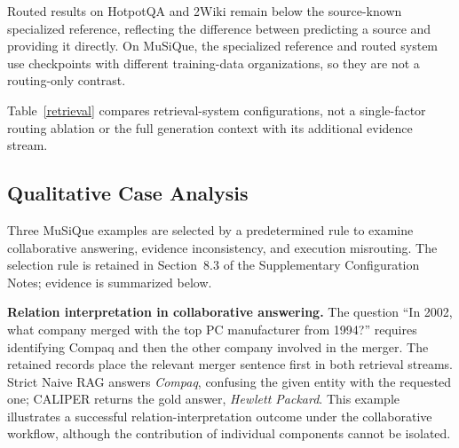 \documentclass[a4paper,fleqn]{cas-dc}
\begin{document}
\begin{table}[pos=!htb]
\caption{Retrieval-only comparison: mean evidence recall at the top 3/5/10 sentence-level units. MuSiQue maps these units to source paragraphs for recall scoring only; FT-SEP is the source-known reference.}
\label{retrieval}
\centering
\fontsize{8}{10}\selectfont
\setlength{\tabcolsep}{2.5pt}
\end{table}

Routed results on HotpotQA and 2Wiki remain below the source-known specialized reference, reflecting the difference between predicting a source and providing it directly. On MuSiQue, the specialized reference and routed system use checkpoints with different training-data organizations, so they are not a routing-only contrast.

Table~\ref{retrieval} compares retrieval-system configurations, not a single-factor routing ablation or the full generation context with its additional evidence stream.

\subsection{Qualitative Case Analysis}
Three MuSiQue examples are selected by a predetermined rule to examine collaborative answering, evidence inconsistency, and execution misrouting. The selection rule is retained in Section~8.3 of the Supplementary Configuration Notes; evidence is summarized below.

\textbf{Relation interpretation in collaborative answering.} The question ``In 2002, what company merged with the top PC manufacturer from 1994?'' requires identifying Compaq and then the other company involved in the merger. The retained records place the relevant merger sentence first in both retrieval streams. Strict Naive RAG answers \textit{Compaq}, confusing the given entity with the requested one; CALIPER returns the gold answer, \textit{Hewlett Packard}. This example illustrates a successful relation-interpretation outcome under the collaborative workflow, although the contribution of individual components cannot be isolated.
\end{document}
